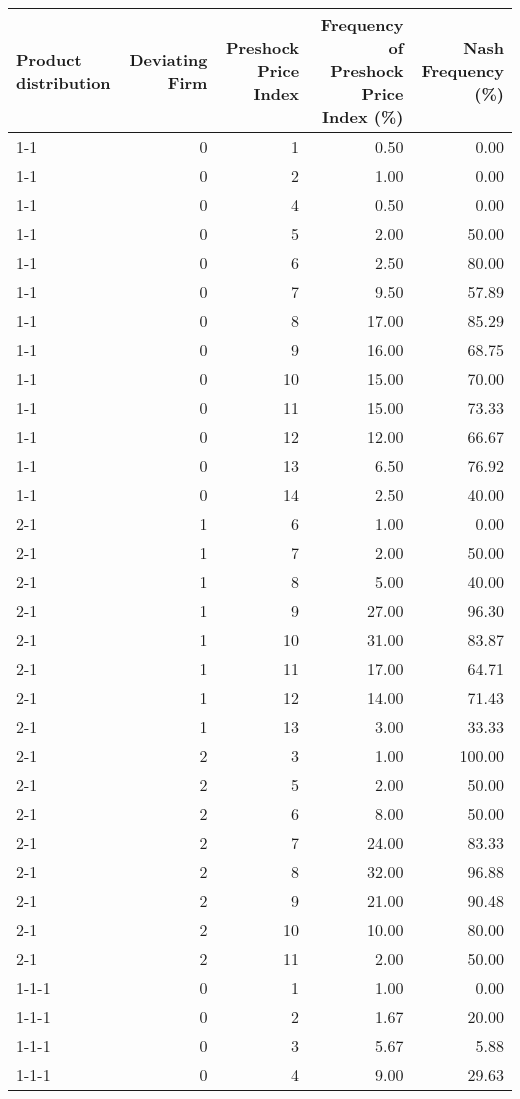 \begin{tabular}{lrrrr}
\toprule
Product distribution & Deviating Firm & Preshock Price Index & Frequency of Preshock Price Index (\%) & Nash Frequency (\%) \\
\midrule
1-1 & 0 & 1 & 0.50 & 0.00 \\
1-1 & 0 & 2 & 1.00 & 0.00 \\
1-1 & 0 & 4 & 0.50 & 0.00 \\
1-1 & 0 & 5 & 2.00 & 50.00 \\
1-1 & 0 & 6 & 2.50 & 80.00 \\
1-1 & 0 & 7 & 9.50 & 57.89 \\
1-1 & 0 & 8 & 17.00 & 85.29 \\
1-1 & 0 & 9 & 16.00 & 68.75 \\
1-1 & 0 & 10 & 15.00 & 70.00 \\
1-1 & 0 & 11 & 15.00 & 73.33 \\
1-1 & 0 & 12 & 12.00 & 66.67 \\
1-1 & 0 & 13 & 6.50 & 76.92 \\
1-1 & 0 & 14 & 2.50 & 40.00 \\
2-1  & 1 & 6 & 1.00 & 0.00 \\
2-1  & 1 & 7 & 2.00 & 50.00 \\
2-1  & 1 & 8 & 5.00 & 40.00 \\
2-1  & 1 & 9 & 27.00 & 96.30 \\
2-1  & 1 & 10 & 31.00 & 83.87 \\
2-1  & 1 & 11 & 17.00 & 64.71 \\
2-1  & 1 & 12 & 14.00 & 71.43 \\
2-1  & 1 & 13 & 3.00 & 33.33 \\
2-1  & 2 & 3 & 1.00 & 100.00 \\
2-1  & 2 & 5 & 2.00 & 50.00 \\
2-1  & 2 & 6 & 8.00 & 50.00 \\
2-1  & 2 & 7 & 24.00 & 83.33 \\
2-1  & 2 & 8 & 32.00 & 96.88 \\
2-1  & 2 & 9 & 21.00 & 90.48 \\
2-1  & 2 & 10 & 10.00 & 80.00 \\
2-1  & 2 & 11 & 2.00 & 50.00 \\
1-1-1 & 0 & 1 & 1.00 & 0.00 \\
1-1-1 & 0 & 2 & 1.67 & 20.00 \\
1-1-1 & 0 & 3 & 5.67 & 5.88 \\
1-1-1 & 0 & 4 & 9.00 & 29.63 \\

\end{tabular}
